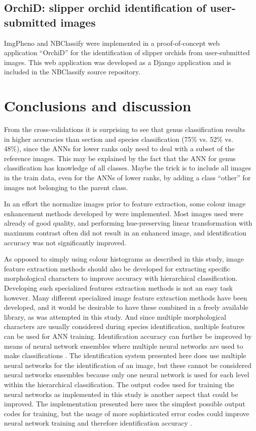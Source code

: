 \documentclass[twocolumn]{bmcart}
\begin{document}
\subsection{OrchiD: slipper orchid identification of user-submitted images}

ImgPheno and NBClassify were implemented in a proof-of-concept web application ``OrchiD'' for the identification of slipper orchids from user-submitted images. This web application was developed as a Django application and is included in the NBClassify source repository.

\section{Conclusions and discussion}
\label{sec:conclusion}

From the cross-validations it is surprising to see that genus classification results in higher accuracies than section and species classification (75\% vs. 52\% vs. 48\%), since the ANNs for lower ranks only need to deal with a subset of the reference images. This may be explained by the fact that the ANN for genus classification has knowledge of all classes. Maybe the trick is to include all images in the train data, even for the ANNs of lower ranks, by adding a class ``other'' for images not belonging to the parent class.

In an effort the normalize images prior to feature extraction, some colour image enhancement methods developed by \cite{Naik2003} were implemented. Most images used were already of good quality, and performing hue-preserving linear transformation with maximum contrast often did not result in an enhanced image, and identification accuracy was not significantly improved.

As opposed to simply using colour histograms as described in this study, image feature extraction methods should also be developed for extracting specific morphological characters to improve accuracy with hierarchical classification. Developing such specialized features extraction methods is not an easy task however. Many different specialized image feature extraction methods have been developed, and it would be desirable to have these combined in a freely available library, as was attempted in this study. And since multiple morphological characters are usually considered during species identification, multiple features can be used for ANN training. Identification accuracy can further be improved by means of neural network ensembles where multiple neural networks are used to make classifications \cite{Hansen1990}. The identification system presented here does use multiple neural networks for the identification of an image, but these cannot be considered neural networks ensembles because only one neural network is used for each level within the hierarchical classification. The output codes used for training the neural networks as implemented in this study is another aspect that could be improved. The implementation presented here uses the simplest possible output codes for training, but the usage of more sophisticated error codes could improve neural network training and therefore identification accuracy \cite{Dietterich1995}.
\end{document}
